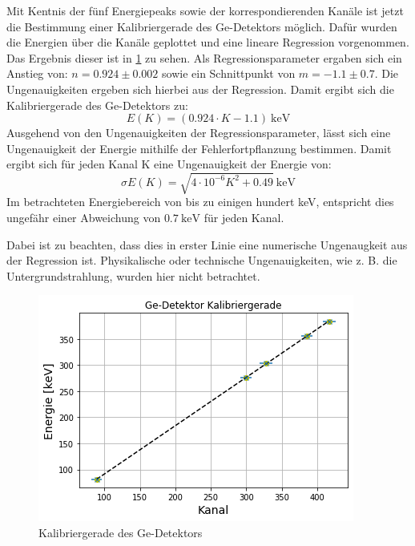 Mit Kentnis der fünf Energiepeaks sowie der korrespondierenden Kanäle ist jetzt die Bestimmung einer Kalibriergerade des Ge-Detektors möglich.
Dafür wurden die Energien über die Kanäle geplottet und eine lineare Regression vorgenommen.
Das Ergebnis dieser ist in \ref{Gegerade} zu sehen.
Als Regressionsparameter ergaben sich ein Anstieg von: $n = 0.924 \pm 0.002$ sowie ein Schnittpunkt von $m = -1.1 \pm 0.7$.
Die Ungenauigkeiten ergeben sich hierbei aus der Regression.
Damit ergibt sich die Kalibriergerade des Ge-Detektors zu:
\begin{equation}
E(K) = (0.924 \cdot K - 1.1) \ \si{\kilo\electronvolt}
\end{equation}
Ausgehend von den Ungenauigkeiten der Regressionsparameter, lässt sich eine Ungenauigkeit der Energie mithilfe der Fehlerfortpflanzung bestimmen.
Damit ergibt sich für jeden Kanal K eine Ungenauigkeit der Energie von:
\begin{equation}
\sigma E(K) = \sqrt{4 \cdot 10^{-6} K^2 + 0.49} \ \si{\kilo\electronvolt}
\end{equation}
Im betrachteten Energiebereich von bis zu einigen hundert \si{\kilo\electronvolt}, entspricht dies ungefähr einer Abweichung von $0.7 \ \si{\kilo\electronvolt}$ für jeden Kanal.

Dabei ist zu beachten, dass dies in erster Linie eine numerische Ungenaugkeit aus der Regression ist.
Physikalische oder technische Ungenauigkeiten, wie z. B. die Untergrundstrahlung, wurden hier nicht betrachtet.

\begin{figure}[h!]
  \includegraphics[width=\linewidth]{images/Kalibriergerade1.png}
  \caption{Kalibriergerade des Ge-Detektors}
  \label{Gegerade}
\end{figure}

